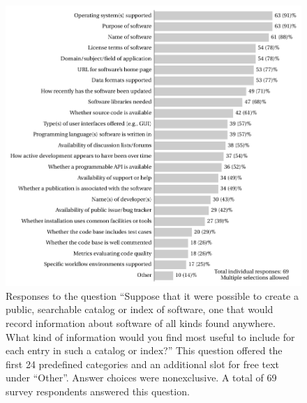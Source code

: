 \documentclass{casicswhitepaper}
\begin{document}
\begin{figure}[t]
  \centering
  \includegraphics[width=6.1in]{files/plots/info-to-include-in-index.pdf}
  \vspace*{-2ex}
  \caption{Responses to the question ``Suppose that it were possible to create a public, searchable catalog or index of software, one that would record information about software of all kinds found anywhere.  What kind of information would you find most useful to include for each entry in such a catalog or index?'' This question offered the first 24 predefined categories and an additional slot for free text under ``Other''.  Answer choices were nonexclusive.  A total of 69 survey respondents answered this question.}
  \label{info-to-include}
\end{figure}

% 
\end{document}
